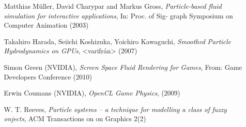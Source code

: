 \documentclass[paper=a4, fontsize=11pt]{report}
\numberwithin{equation}{section} %
\numberwithin{figure}{section} %
\numberwithin{table}{section} %
\begin{document}
\begin{thebibliography}{99}

 Matthias Müller, David Charypar and Markus Gross, \emph{Particle-based fluid simulation for interactive applications}, In: Proc. of Sig- graph Symposium on Computer Animation (2003)\newline

 Takahiro Harada, Seiichi Koshizuka, Yoichiro Kawaguchi, \emph{Smoothed Particle Hydrodynamics on GPUs}, <varifrån> (2007)\newline

 Simon Green (NVIDIA), \emph{Screen Space Fluid Rendering for Games}, From: Game Developers Conference (2010)\newline

 Erwin Coumans (NVIDIA), \emph{OpenCL Game Physics}, (2009) \newline

 W. T. Reeves, \emph{Particle systems -- a technique for modelling a class of fuzzy onjects}, ACM Transactions on on Graphics 2(2) \newline

\end{thebibliography}
\end{document}

